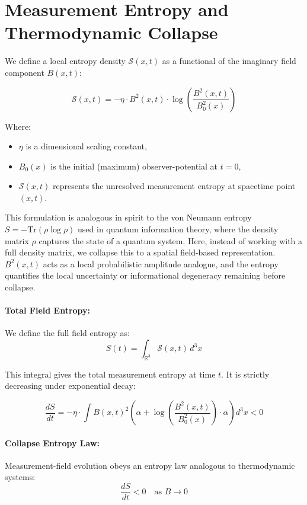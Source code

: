 \newpage


\section{Measurement Entropy and Thermodynamic Collapse}

We define a local entropy density $\mathcal{S}(x, t)$ as a functional of the imaginary field component $B(x, t)$:

\[
\mathcal{S}(x, t) = -\eta \cdot B^2(x, t) \cdot \log\left( \frac{B^2(x, t)}{B_0^2(x)} \right)
\]

Where:
\begin{itemize}
  \item $\eta$ is a dimensional scaling constant,
  \item $B_0(x)$ is the initial (maximum) observer-potential at $t = 0$,
  \item $\mathcal{S}(x, t)$ represents the unresolved measurement entropy at spacetime point $(x, t)$. \cite{imaginary_meta} 
\end{itemize}

This formulation is analogous in spirit to the von Neumann entropy $S = -\text{Tr}(\rho \log \rho)$ used in quantum information theory, where the density matrix $\rho$ captures the state of a quantum system. \cite{imaginary_meta} Here, instead of working with a full density matrix, we collapse this to a spatial field-based representation. $B^2(x,t)$ acts as a local probabilistic amplitude analogue, and the entropy quantifies the local uncertainty or informational degeneracy remaining before collapse. \cite{imaginary_meta} 

\paragraph{Total Field Entropy:}
We define the full field entropy as:
\[
S(t) = \int_{\mathbb{R}^3} \mathcal{S}(x, t) \, d^3x
\]

This integral gives the total measurement entropy at time $t$. \cite{imaginary_meta} It is strictly decreasing under exponential decay:

\[
\frac{dS}{dt} = -\eta \cdot \int B(x,t)^2 \left( \alpha + \log \left( \frac{B^2(x,t)}{B_0^2(x)} \right) \cdot \alpha \right) d^3x < 0
\]

\paragraph{Collapse Entropy Law:}
Measurement-field evolution obeys an entropy law analogous to thermodynamic systems:
\[
\frac{dS}{dt} < 0
\quad \text{as } B \rightarrow 0
\]

